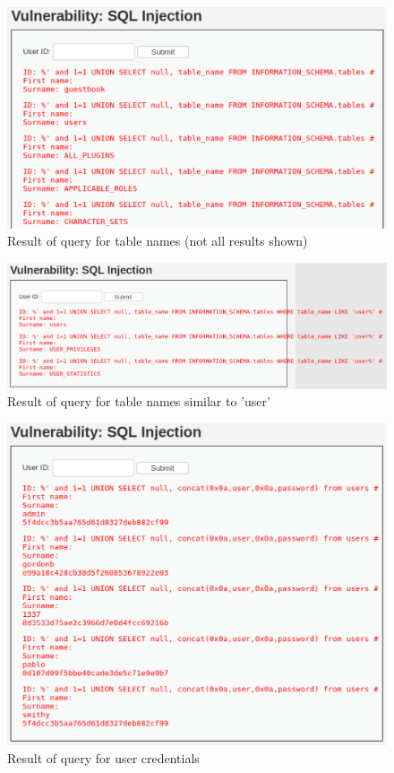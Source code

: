 \documentclass[11pt]{article}
\begin{document}
\begin{figure}[htbp]
  \centering
  \includegraphics[width=1\linewidth]{./SQL-2.png}
  \caption{\label{fig:SQL-2}
  Result of query for table names (not all results shown)}
\end{figure}
\begin{figure}[htbp]
  \centering
  \includegraphics[width=1\linewidth]{./SQL-3.png}
  \caption{\label{fig:SQL-3}
  Result of query for table names similar to 'user'}
\end{figure}
\begin{figure}[htbp]
  \centering
  \includegraphics[width=1\linewidth]{./SQL-4.png}
  \caption{\label{fig:SQL-4}
  Result of query for user credentials}
\end{figure}\\
\end{document}
